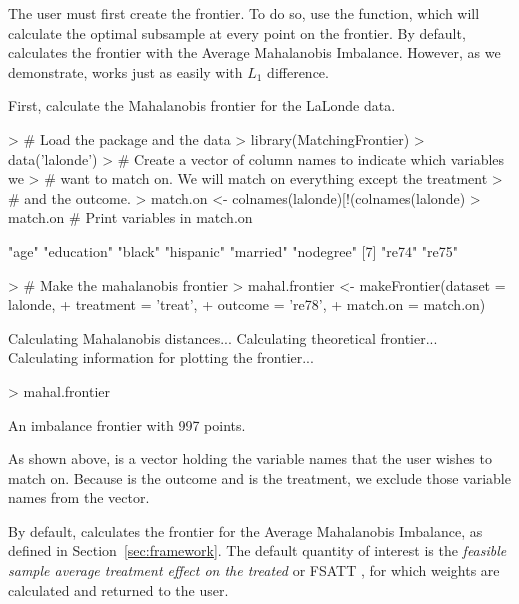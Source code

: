 \documentclass[nojss]{jss}
\begin{document}
The user must first create the frontier. To do so, use the
 function, which will calculate the optimal
subsample at every point on the frontier. By default,
 calculates the frontier with the Average
Mahalanobis Imbalance. However, as we demonstrate,
 works just as easily with $L_1$ difference.

First, calculate the Mahalanobis frontier for the LaLonde
data.

\begin{Schunk}
\begin{Sinput}
> # Load the package and the data
> library(MatchingFrontier)
> data('lalonde')
> # Create a vector of column names to indicate which variables we 
> # want to match on. We will match on everything except the treatment
> # and the outcome.
> match.on <- colnames(lalonde)[!(colnames(lalonde) %
> match.on # Print variables in match.on
\end{Sinput}
\begin{Soutput}
[1] "age"       "education" "black"     "hispanic"  "married"   "nodegree" 
[7] "re74"      "re75"     
\end{Soutput}
\begin{Sinput}
> # Make the mahalanobis frontier
> mahal.frontier <- makeFrontier(dataset = lalonde, 
+                             treatment = 'treat', 
+                             outcome = 're78', 
+                             match.on = match.on)
\end{Sinput}
\begin{Soutput}
Calculating Mahalanobis distances...
Calculating theoretical frontier...
Calculating information for plotting the frontier...
\end{Soutput}
\begin{Sinput}
> mahal.frontier
\end{Sinput}
\begin{Soutput}
An imbalance frontier with 997 points.
\end{Soutput}
\end{Schunk}

As shown above,  is a vector holding the variable names
that the user wishes to match on. Because  is
the outcome and  is the treatment, we exclude those
variable names from the vector.

By default,  calculates the frontier for the
Average Mahalanobis Imbalance, as defined in
Section~\ref{sec:framework}.  The default quantity of interest is the
\emph{feasible sample average treatment effect on the treated} or
FSATT \citep{kingND}, for which weights are calculated and returned to the
user. 
\end{document}
